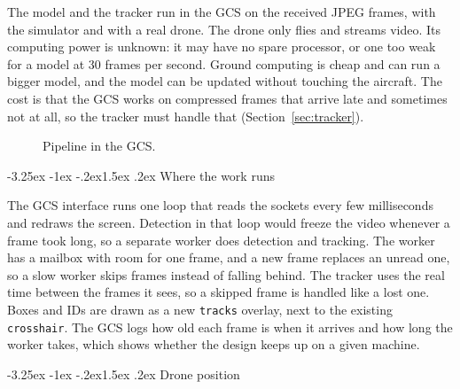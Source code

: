 \documentclass[11pt]{article}
\makeatletter
\renewcommand\subsection{\@startsection{subsection}{2}{\z@}%
  {-3.25ex \@plus -1ex \@minus -.2ex}{1.5ex \@plus .2ex}%
  {\normalfont\large\bfseries\color{accent}}}
\makeatother
\begin{document}
The model and the tracker run in the GCS on the received JPEG frames, with
the simulator and with a real drone. The drone only flies and streams video.
Its computing power is unknown: it may have no spare processor, or one too
weak for a model at 30 frames per second. Ground computing is cheap and can
run a bigger model, and the model can be updated without touching the
aircraft. The cost is that the GCS works on compressed frames that arrive
late and sometimes not at all, so the tracker must handle that
(Section~\ref{sec:tracker}).

\begin{figure}[htbp]
\centering
{}
\caption{Pipeline in the GCS.}
\end{figure}

\subsection{Where the work runs}
\label{sec:worker}

The GCS interface runs one loop that reads the sockets every few
milliseconds and redraws the screen. Detection in that loop would freeze the
video whenever a frame took long, so a separate worker does detection and
tracking. The worker has a mailbox with room for one frame, and a new frame
replaces an unread one, so a slow worker skips frames instead of falling
behind. The tracker uses the real time between the frames it sees, so a
skipped frame is handled like a lost one. Boxes and IDs are drawn as a new
\texttt{tracks} overlay, next to the existing \texttt{crosshair}. The GCS
logs how old each frame is when it arrives and how long the worker takes,
which shows whether the design keeps up on a given machine.

\subsection{Drone position}
\end{document}
